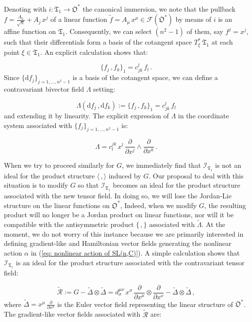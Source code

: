 \documentclass[11pt]{article}
\newcommand{\be}{\begin{equation}}
\newcommand{\ee}{\end{equation}}
\newcommand{\vsp}{\vspace{0.4cm}}
\newcommand{\obsp}{\mathfrak{O}}
\begin{document}
Denoting with $i\colon \mathfrak{T}_{1}\rightarrow\obsp^{*}$ the canonical immersion, we note that the pullback $f=\frac{A_{0}}{\sqrt{n}} + A_{j}\,x^{j}$ of a linear function $\widetilde{f}=A_{\mu}\,x^{\mu}\in\mathcal{F}(\obsp^{*})$ by means of $i$ is an affine function on $\mathfrak{T}_{1}$.
Consequently, we can select $(n^{2}-1)$ of them, say $f^{j}=x^{j}$, such that their differentials form a basis of the cotangent space $T^{*}_{\xi}\,\mathfrak{T}_{1}$ at each point $\xi\in\mathfrak{T}_{1}$.
An explicit calculation shows that:

\be
\{f_{j}\,,f_{k}\}_{1}=c_{jk}^{l}\,f_{l}\,.
\ee
Since $\{\mathrm{d}f_{j}\}_{j=1,...,n^{2}-1}$ is a basis of the cotangent space, we can define a contravariant bivector field $\Lambda$ setting:

\be
\Lambda(\mathrm{d}f_{j}\,,\mathrm{d}f_{k}):=\{f_{j}\,,f_{k}\}_{1}=c_{jk}^{l}\,f_{l}
\ee
and extending it by linearity.
The explicit expression of $\Lambda$ in the coordinate system associated with $\{f_{j}\}_{j=1,...,n^{2}-1}$ is:

\be\label{eqn: lambda on trace 1}
\Lambda=c^{jk}_{l}\,x^{l}\,\frac{\partial}{\partial x^{j}}\wedge\frac{\partial}{\partial x^{k}}\,.
\ee

\vsp
When we try to proceed similarly for $G$, we immediately find that $\mathcal{I}_{\mathfrak{T}_{1}}$ is not an ideal for the product structure $\langle\,,\rangle$ induced by $G$.
Our proposal to deal with this situation is to modify $G$ so that $\mathcal{I}_{\mathfrak{T}_{1}}$ becomes an ideal for the product structure associated with the new tensor field.
In doing so, we will lose the Jordan-Lie structure on the linear functions on $\obsp^{*}$,
Indeed, when we modify $G$, the resulting product will no longer be a Jordan product on linear functions, nor will it be compatible with the antisymmetric product $\{\,,\}$ associated with $\widetilde{\Lambda}$.
At the moment, we do not worry of this instance because we are primarily interested in defining  gradient-like and Hamiltonian vector fields generating the nonlinear action $\alpha$ in (\ref{eq: nonlinear action of SL(n,C)}).
A simple calculation shows that $\mathcal{I}_{\mathfrak{T}_{1}}$ is an ideal for the product structure associated with the contravariant tensor field:

\be
\widetilde{\mathcal{R}}:= G - \widetilde{\Delta}\otimes\widetilde{\Delta}  =d^{\mu\nu}_{\sigma}\,x^{\sigma}\,\frac{\partial}{\partial x^{\mu}}\otimes\frac{\partial}{\partial x^{\nu}} -  \widetilde{\Delta}\otimes\widetilde{\Delta}\,,
\ee
where $\widetilde{\Delta}=x^{\mu}\,\frac{\partial}{\partial x^{\mu}}$ is the Euler vector field representing the linear structure of $\obsp^{*}$.
The gradient-like vector fields associated with $\widetilde{\mathcal{R}}$ are:
\end{document}
